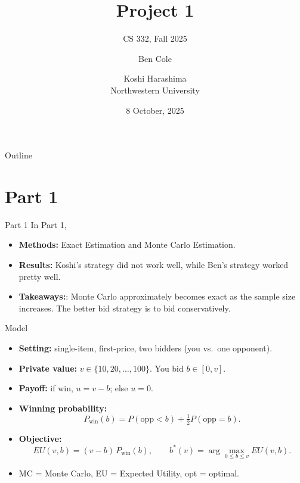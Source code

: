 \documentclass{beamer}
\title[Project 1]{Project 1}
\subtitle{CS 332, Fall 2025}
\author{Ben Cole \and Koshi Harashima\\ Northwestern University}
\date{8 October, 2025}
\begin{document}
\maketitle

\begin{frame}{Outline}
  \tableofcontents
\end{frame}


\section{Part 1}


\begin{frame}{Part 1}
In Part 1, 
\medskip
\begin{itemize}
  \item \textbf{Methods:} Exact Estimation and Monte Carlo Estimation.
  \item \textbf{Results:} Koshi's strategy did not work well, while Ben's strategy worked pretty well.
  \item \textbf{Takeaways:}: Monte Carlo approximately becomes exact as the sample size increases. The better bid strategy is to bid conservatively.
\end{itemize}
\end{frame}


\begin{frame}{Model}
\medskip
\begin{itemize}
  \item \textbf{Setting:} single-item, first-price, two bidders (you vs.\ one opponent).
  \item \textbf{Private value:} $v\in\{10,20,\dots,100\}$. You bid $b\in[0,v]$.
  \item \textbf{Payoff:} if win, $u=v-b$; else $u=0$.
  \item \textbf{Winning probability:}
    \[
      P_{\text{win}}(b)=P(\text{opp}<b)+\tfrac12P(\text{opp}=b).
    \]
  \item \textbf{Objective:}
    \[
      EU(v,b)=(v-b)\,P_{\text{win}}(b),\qquad b^*(v)=\arg\max_{0\le b\le v}EU(v,b).
    \]
  \item MC = Monte Carlo,\; EU = Expected Utility,\; opt = optimal.
\end{itemize}
\end{frame}
\end{document}
